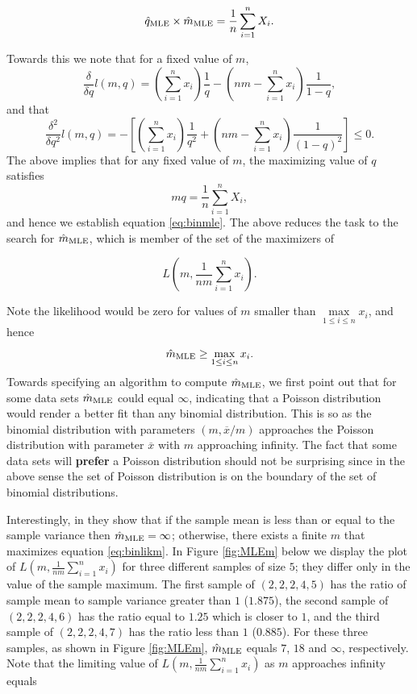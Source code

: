 \documentclass[]{book}
\theoremstyle{definition}
\theoremstyle{definition}
\theoremstyle{definition}
\theoremstyle{remark}
\begin{document}
\begin{equation}
\hat{q}_{\rm MLE}\times \hat{m}_{\rm MLE}= \frac{1}{n}\sum_{i=1}^n X_i.  
\label{eq:binmle}
\end{equation}

Towards this we note that for a fixed value of \(m\), \[
\frac{\delta}{\delta q} l(m,q) = \left({\sum_{i=1}^n x_i}\right)\frac{1}{q}- \left({nm-\sum_{i=1}^n x_i}\right)\frac{1}{1-q},
\] and that \[
\frac{\delta^2}{\delta q^2} l(m,q) = -\left[\left({\sum_{i=1}^n x_i}\right)\frac{1}{q^2} + \left({nm-\sum_{i=1}^n x_i}\right)\frac{1}{(1-q)^2}\right]\leq 0.
\] The above implies that for any fixed value of \(m\), the maximizing
value of \(q\) satisfies \[
mq=\frac{1}{n}\sum_{i=1}^n X_i,
\] and hence we establish equation \eqref{eq:binmle}. The above reduces
the task to the search for \(\hat{m}_{\rm MLE}\), which is member of the
set of the maximizers of

\begin{equation}
L\left(m,\frac{1}{nm}\sum_{i=1}^n x_i\right).
\label{eq:binlikm}
\end{equation}

Note the likelihood would be zero for values of \(m\) smaller than
\(\max\limits_{1\leq i \leq n}x_i\), and hence \[
\hat{m}_{\rm MLE}\geq \max_{1\leq i \leq n}x_i.
\] Towards specifying an algorithm to compute \(\hat{m}_{\rm MLE}\), we
first point out that for some data sets \(\hat{m}_{\rm MLE}\) could
equal \(\infty\), indicating that a Poisson distribution would render a
better fit than any binomial distribution. This is so as the binomial
distribution with parameters \((m,\overline{x}/m)\) approaches the
Poisson distribution with parameter \(\overline{x}\) with \(m\)
approaching infinity. The fact that some data sets will \textbf{prefer}
a Poisson distribution should not be surprising since in the above sense
the set of Poisson distribution is on the boundary of the set of
binomial distributions.

Interestingly, in \citep{olkin1981} they show that if the sample mean is
less than or equal to the sample variance then
\(\hat{m}_{\rm MLE}=\infty\); otherwise, there exists a finite \(m\)
that maximizes equation \eqref{eq:binlikm}. In Figure \ref{fig:MLEm} below
we display the plot of \(L\left(m,\frac{1}{nm}\sum_{i=1}^n x_i\right)\)
for three different samples of size \(5\); they differ only in the value
of the sample maximum. The first sample of \((2,2,2,4,5)\) has the ratio
of sample mean to sample variance greater than \(1\) (\(1.875\)), the
second sample of \((2,2,2,4,6)\) has the ratio equal to \(1.25\) which
is closer to \(1\), and the third sample of \((2,2,2,4,7)\) has the
ratio less than \(1\) (\(0.885\)). For these three samples, as shown in
Figure \ref{fig:MLEm}, \(\hat{m}_{\rm MLE}\) equals \(7\), \(18\) and
\(\infty\), respectively. Note that the limiting value of
\(L\left(m,\frac{1}{nm}\sum_{i=1}^n x_i\right)\) as \(m\) approaches
infinity equals
\end{document}
